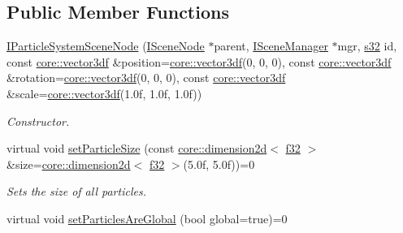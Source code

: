 \subsection*{Public Member Functions}
\begin{DoxyCompactItemize}
\item 
\mbox{\label{classirr_1_1scene_1_1IParticleSystemSceneNode_a41c24f2388af5451d23f25c79b95295a}} 
\hyperlink{classirr_1_1scene_1_1IParticleSystemSceneNode_a41c24f2388af5451d23f25c79b95295a}{I\+Particle\+System\+Scene\+Node} (\hyperlink{classirr_1_1scene_1_1ISceneNode}{I\+Scene\+Node} $\ast$parent, \hyperlink{classirr_1_1scene_1_1ISceneManager}{I\+Scene\+Manager} $\ast$mgr, \hyperlink{namespaceirr_ac66849b7a6ed16e30ebede579f9b47c6}{s32} id, const \hyperlink{namespaceirr_1_1core_ae6e2b2a6c552833ebbd5b7463d03586b}{core\+::vector3df} \&position=\hyperlink{namespaceirr_1_1core_ae6e2b2a6c552833ebbd5b7463d03586b}{core\+::vector3df}(0, 0, 0), const \hyperlink{namespaceirr_1_1core_ae6e2b2a6c552833ebbd5b7463d03586b}{core\+::vector3df} \&rotation=\hyperlink{namespaceirr_1_1core_ae6e2b2a6c552833ebbd5b7463d03586b}{core\+::vector3df}(0, 0, 0), const \hyperlink{namespaceirr_1_1core_ae6e2b2a6c552833ebbd5b7463d03586b}{core\+::vector3df} \&scale=\hyperlink{namespaceirr_1_1core_ae6e2b2a6c552833ebbd5b7463d03586b}{core\+::vector3df}(1.\+0f, 1.\+0f, 1.\+0f))
\begin{DoxyCompactList}\small\item\em Constructor. \end{DoxyCompactList}\item 
\mbox{\label{classirr_1_1scene_1_1IParticleSystemSceneNode_a17e1abe0feb0b57e96bf49d984bcbb86}} 
virtual void \hyperlink{classirr_1_1scene_1_1IParticleSystemSceneNode_a17e1abe0feb0b57e96bf49d984bcbb86}{set\+Particle\+Size} (const \hyperlink{classirr_1_1core_1_1dimension2d}{core\+::dimension2d}$<$ \hyperlink{namespaceirr_a0277be98d67dc26ff93b1a6a1d086b07}{f32} $>$ \&size=\hyperlink{classirr_1_1core_1_1dimension2d}{core\+::dimension2d}$<$ \hyperlink{namespaceirr_a0277be98d67dc26ff93b1a6a1d086b07}{f32} $>$(5.\+0f, 5.\+0f))=0
\begin{DoxyCompactList}\small\item\em Sets the size of all particles. \end{DoxyCompactList}\item 
virtual void \hyperlink{classirr_1_1scene_1_1IParticleSystemSceneNode_adc1c12bd7bf1a075f00c5dafa3aff266}{set\+Particles\+Are\+Global} (bool global=true)=0

\end{DoxyCompactItemize}
